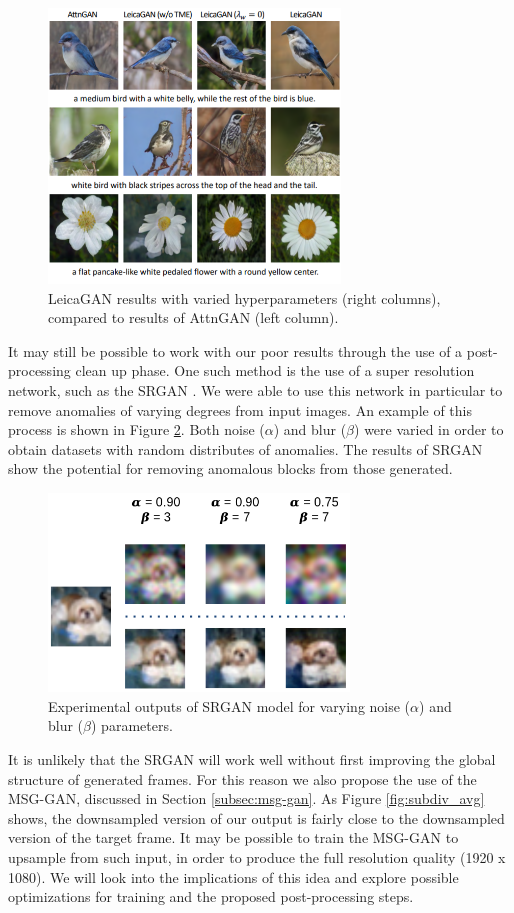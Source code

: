 \documentclass[letterpaper]{article} %
\begin{document}
\begin{figure}[htbp]
\centerline{\includegraphics[width=7.75cm]{leicagan.png}}
\caption{LeicaGAN results with varied hyperparameters (right columns), compared 
to results 
of AttnGAN (left column)\cite{leica}.}
\label{fig:leicagan}
\end{figure}

It may still be possible to work with our poor results through the use of a 
post-processing clean up phase. One such method is the use of a super 
resolution network, such as the SRGAN \cite{srgan}. We were able to use this 
network in particular to remove anomalies of varying degrees from input images. 
An example of this process is shown in Figure \ref{fig:srgan}. Both noise 
($\alpha$) and blur ($\beta$) were varied in order to obtain datasets with 
random distributes of anomalies. The results of SRGAN show the potential for 
removing anomalous blocks from those generated.

\begin{figure}[htbp]
\centerline{\includegraphics[width=8cm]{srgan_outputs.png}}
\caption{Experimental outputs of SRGAN model for varying noise ($\alpha$) and 
blur ($\beta$) parameters.}
\label{fig:srgan}
\end{figure}

It is unlikely that the SRGAN will work well without first improving the global 
structure of generated frames. For this reason we also propose the use of the 
MSG-GAN, discussed in Section \ref{subsec:msg-gan}. As Figure 
\ref{fig:subdiv_avg} shows, the downsampled version of our output is fairly 
close to the downsampled version of the target frame. It may be possible to 
train the MSG-GAN to upsample from such input, in order to produce the full 
resolution quality (1920 x 1080). We will look into the implications of this 
idea and explore possible optimizations for training and the proposed 
post-processing steps.
\end{document}
